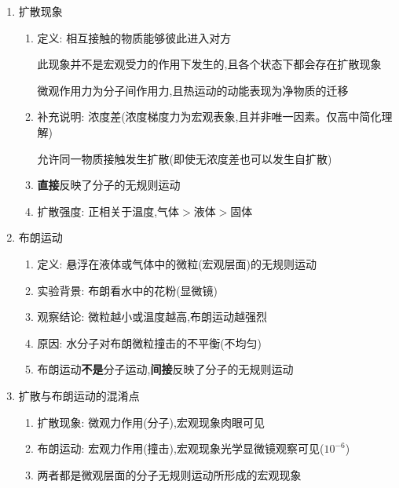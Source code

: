 \documentclass{article}
\begin{document}
\begin{enumerate}
    \item 扩散现象
          \begin{enumerate}[label = (\arabic*)]
              \item 定义: 相互接触的物质能够彼此进入对方

                    \hspace{2.7em}此现象并不是宏观受力的作用下发生的,且各个状态下都会存在扩散现象

                    \hspace{2.7em}微观作用力为分子间作用力,且热运动的动能表现为净物质的迁移
              \item 补充说明: 浓度差(浓度梯度力为宏观表象,且并非唯一因素。仅高中简化理解)

                    \hspace{4.7em}允许同一物质接触发生扩散(即使无浓度差也可以发生自扩散)
              \item \textbf{直接}反映了分子的无规则运动
              \item 扩散强度: 正相关于温度,气体$>$液体$>$固体
          \end{enumerate}
    \item 布朗运动
          \begin{enumerate}[label = (\arabic*)]
              \item 定义: 悬浮在液体或气体中的微粒(宏观层面)的无规则运动
              \item 实验背景: 布朗看水中的花粉(显微镜)
              \item 观察结论: 微粒越小或温度越高,布朗运动越强烈
              \item 原因: 水分子对布朗微粒撞击的不平衡(不均匀)
              \item 布朗运动\textbf{不是}分子运动,\textbf{间接}反映了分子的无规则运动
          \end{enumerate}
    \item 扩散与布朗运动的混淆点
          \begin{enumerate}[label = (\arabic*)]
              \item 扩散现象: 微观力作用(分子),宏观现象肉眼可见
              \item 布朗运动: 宏观力作用(撞击),宏观现象光学显微镜观察可见($10^{-6}$)
              \item 两者都是微观层面的分子无规则运动所形成的宏观现象
          \end{enumerate}
\end{enumerate}
\end{document}
